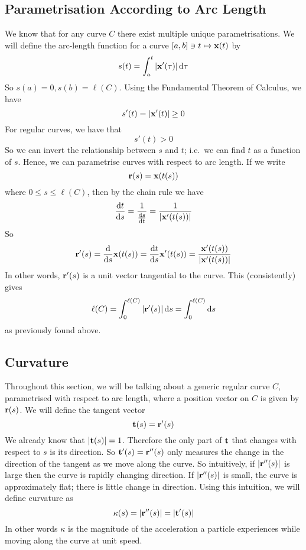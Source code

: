 \subsection{Parametrisation According to Arc Length}
We know that for any curve \(C\) there exist multiple unique parametrisations. We will define the arc-length function for a curve \([a, b] \ni t \mapsto \vb x(t)\) by
\[ s(t) = \int_a^t \abs{\vb x'(\tau)} \,\dd \tau \]
So \(s(a) = 0, s(b) = \ell(C)\). Using the Fundamental Theorem of Calculus, we have
\[ s'(t) = \abs{\vb x'(t)} \geq 0 \]
For regular curves, we have that
\[ s'(t) > 0 \]
So we can invert the relationship between \(s\) and \(t\); i.e.\ we can find \(t\) as a function of \(s\). Hence, we can parametrise curves with respect to arc length. If we write
\[ \vb r(s) = \vb x(t(s)) \]
where \(0 \leq s \leq \ell(C)\), then by the chain rule we have
\[ \frac{\dd{t}}{\dd{s}} = \frac{1}{\frac{\dd{s}}{\dd{t}}} = \frac{1}{\abs{\vb x'(t(s))}} \]
So
\[ \vb r'(s) = \frac{\dd}{\dd{s}} \vb x(t(s)) = \frac{\dd{t}}{\dd{s}} \vb x'(t(s)) = \frac{\vb x'(t(s))}{\abs{\vb x'(t(s))}} \]
In other words, \(\vb r'(s)\) is a unit vector tangential to the curve. This (consistently) gives
\[ \ell(C) = \int_0^{\ell(C)} \abs{\vb r'(s)} \dd{s} = \int_0^{\ell(C)} \dd{s} \]
as previously found above.

\subsection{Curvature}
Throughout this section, we will be talking about a generic regular curve \(C\), parametrised with respect to arc length, where a position vector on \(C\) is given by \(\vb r(s)\). We will define the tangent vector
\[ \vb t(s) = \vb r'(s) \]
We already know that \(\abs{\vb t(s)} = 1\). Therefore the only part of \(\vb t\) that changes with respect to \(s\) is its direction. So \(\vb t'(s) = \vb r''(s)\) only measures the change in the direction of the tangent as we move along the curve. So intuitively, if \(\abs{\vb r''(s)}\) is large then the curve is rapidly changing direction. If \(\abs{\vb r''(s)}\) is small, the curve is approximately flat; there is little change in direction. Using this intuition, we will define curvature as
\[ \kappa(s) = \abs{\vb r''(s)} = \abs{\vb t'(s)} \]
In other words \(\kappa\) is the magnitude of the acceleration a particle experiences while moving along the curve at unit speed.

